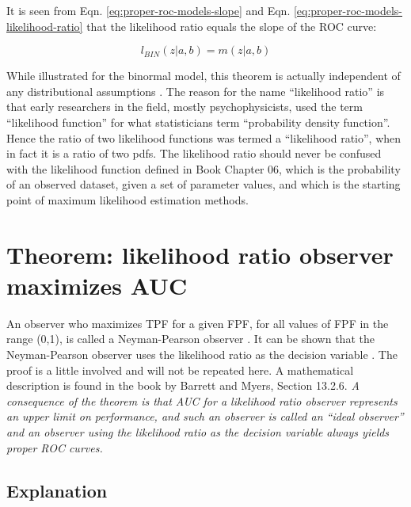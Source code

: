 \documentclass[
]{book}
\begin{document}
It is seen from Eqn. \eqref{eq:proper-roc-models-slope} and Eqn. \eqref{eq:proper-roc-models-likelihood-ratio} that the likelihood ratio equals the slope of the ROC curve:

\begin{equation} 
l_{BIN}\left( z | a,b\right) = m\left( z | a,b\right)
\label{eq:proper-roc-models-likelihood-ratio-theorem}
\end{equation}

While illustrated for the binormal model, this theorem is actually independent of any distributional assumptions \citep{Egan1975}. The reason for the name ``likelihood ratio'' is that early researchers in the field, mostly psychophysicists, used the term ``likelihood function'' for what statisticians term ``probability density function''. Hence the ratio of two likelihood functions was termed a ``likelihood ratio'', when in fact it is a ratio of two pdfs. The likelihood ratio should never be confused with the likelihood function defined in Book Chapter 06, which is the probability of an observed dataset, given a set of parameter values, and which is the starting point of maximum likelihood estimation methods.

\hypertarget{proper-roc-models-likelihood-ratio-theorem2}{%
\section{Theorem: likelihood ratio observer maximizes AUC}\label{proper-roc-models-likelihood-ratio-theorem2}}

An observer who maximizes TPF for a given FPF, for all values of FPF in the range (0,1), is called a Neyman-Pearson observer \citep{neyman1933ix}. It can be shown that the Neyman-Pearson observer uses the likelihood ratio as the decision variable \citep{green1966signal}. The proof is a little involved and will not be repeated here. A mathematical description is found in the book \citep{barrett2013foundations} by Barrett and Myers, Section 13.2.6. \emph{A consequence of the theorem is that AUC for a likelihood ratio observer represents an upper limit on performance, and such an observer is called an ``ideal observer'' and an observer using the likelihood ratio as the decision variable always yields proper ROC curves.}

\hypertarget{explanation}{%
\subsection{Explanation}\label{explanation}}
\end{document}
